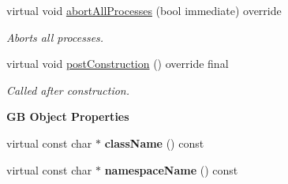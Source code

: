 \begin{Indent}
\begin{DoxyCompactItemize}
virtual void \mbox{\hyperlink{classrev_1_1_process_manager_af27b555fa39d0b64fb0c467691084a6b}{abort\+All\+Processes}} (bool immediate) override
\begin{DoxyCompactList}\small\item\em Aborts all processes. \end{DoxyCompactList}\item 
\mbox{\label{classrev_1_1_process_manager_ae6f8b3b37aed5d3f0653578c269536ee}} 
virtual void \mbox{\hyperlink{classrev_1_1_process_manager_ae6f8b3b37aed5d3f0653578c269536ee}{post\+Construction}} () override final
\begin{DoxyCompactList}\small\item\em Called after construction. \end{DoxyCompactList}\end{DoxyCompactItemize}
\end{Indent}
\begin{Indent}\textbf{ GB Object Properties}\par
\begin{DoxyCompactItemize}
\item 
\mbox{\label{classrev_1_1_process_manager_a4ba3092d7b9e917561cc74b31263bc61}} 
virtual const char $\ast$ {\bfseries class\+Name} () const
\item 
\mbox{\label{classrev_1_1_process_manager_ab785606fd4122167704c0b80570350b1}} 
virtual const char $\ast$ {\bfseries namespace\+Name} () const
\end{DoxyCompactItemize}
\end{Indent}
